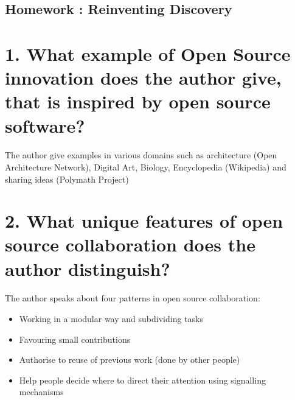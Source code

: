 \documentclass[14pt]
{article}
\begin{document}
\pagestyle{fancy}

\bigskip
\begin{center}
	\section*{\textbf{{\LARGE Homework : Reinventing Discovery}}}
\end{center}
\bigskip\bigskip\bigskip

\section*{1. What example of Open Source innovation does the author give, that is inspired by open source software?}
\paragraph*{} The author give examples in various domains such as architecture (Open Architecture Network), Digital Art, Biology, Encyclopedia (Wikipedia) and sharing ideas (Polymath Project)\\

\section*{2. What unique features of open source collaboration does the author distinguish?}
\paragraph*{} The author speaks about four patterns in open source collaboration:\\
\begin{itemize}
\item Working in a modular way and subdividing tasks\\
\item Favouring small contributions \\
\item Authorise to reuse of previous work (done by other people)\\
\item Help people decide where to direct their attention using signalling mechanisms
\end{itemize} 
\end{document}
